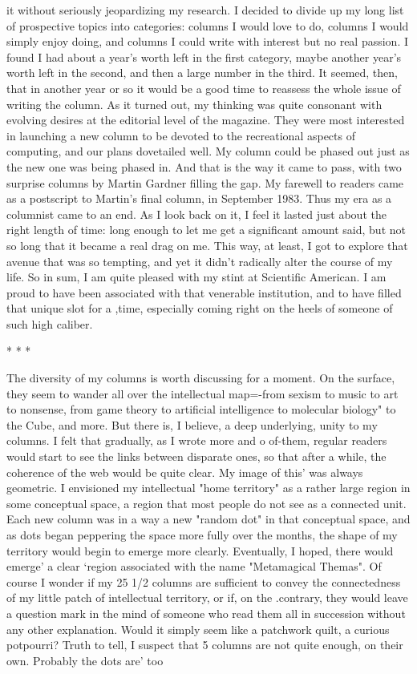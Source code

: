 it without seriously jeopardizing my research. I decided to divide up my long list of
prospective topics into categories: columns I would love to do, columns I would
simply enjoy doing, and columns I could write with interest but no real passion. I
found I had about a year's worth left in the first category, maybe another year's worth
left in the second, and then a large number in the third. It seemed, then, that in another
year or so it would be a good time to reassess the whole issue of writing the column.
As it turned out, my thinking was quite consonant with evolving desires at the
editorial level of the magazine. They were most interested in launching a new column
to be devoted to the recreational aspects of computing, and our plans dovetailed well.
My column could be phased out just as the new one was being phased in. And that is
the way it came to pass, with two surprise columns by Martin Gardner filling the gap.
My farewell to readers came as a postscript to Martin's final column, in September
1983.
         Thus my era as a columnist came to an end. As I look back on it, I feel it lasted
just about the right length of time: long enough to let me get a significant amount
said, but not so long that it became a real drag on me. This way, at least, I got to
explore that avenue that was so tempting, and yet it didn't radically alter the course of
my life. So in sum, I am quite pleased with my stint at Scientific American. I am
proud to have been associated with that venerable institution, and to have filled that
unique slot for a ,time, especially coming right on the heels of someone of such high
caliber.

                                        *   *   *

         The diversity of my columns is worth discussing for a moment. On the
surface, they seem to wander all over the intellectual map=-from sexism to music to
art to nonsense, from game theory to artificial intelligence to molecular biology" to
the Cube, and more. But there is, I believe, a deep underlying, unity to my columns. I
felt that gradually, as I wrote more and
         o of-them, regular readers would start to see the links between disparate ones,
so that after a while, the coherence of the web would be quite clear. My image of this'
was always geometric. I envisioned my intellectual "home territory" as a rather large
region in some conceptual space, a region that most people do not see as a connected
unit. Each new column was in a way a new "random dot" in that conceptual space,
and as dots began peppering the space more fully over the months, the shape of my
territory would begin to emerge more clearly. Eventually, I hoped, there would
emerge' a clear `region associated with the name "Metamagical Themas".
         Of course I wonder if my 25 1/2 columns are sufficient to convey the
connectedness of my little patch of intellectual territory, or if, on the .contrary, they
would leave a question mark in the mind of someone who read them all in succession
without any other explanation. Would it simply seem like a patchwork quilt, a curious
potpourri? Truth to tell, I suspect that 5 columns are not quite enough, on their own.
Probably the dots are' too





